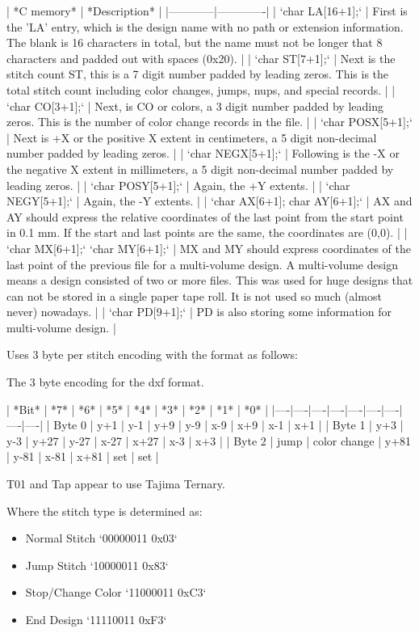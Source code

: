 \documentclass[a4paper, 11pt]{report}
\begin{document}
| *C memory* | *Description* |
|------------|-------------|
| `char LA[16+1];` | First is the 'LA' entry, which is the design name with no path or extension information. The blank is 16 characters in total, but the name must not be longer that 8 characters and padded out with spaces (0x20). |
| `char ST[7+1];` | Next is the stitch count ST, this is a 7 digit number padded by leading zeros. This is the total stitch count including color changes, jumps, nups, and special records. |
| `char CO[3+1];` | Next, is CO or colors, a 3 digit number padded by leading zeros. This is the number of color change records in the file. |
| `char POSX[5+1];` | Next is +X or the positive X extent in centimeters, a 5 digit non-decimal number padded by leading zeros. |
| `char NEGX[5+1];` | Following is the -X or the negative X extent in millimeters, a 5 digit non-decimal number padded by leading zeros. |
| `char POSY[5+1];` | Again, the +Y extents. |
| `char NEGY[5+1];` | Again, the -Y extents. |
| `char AX[6+1]; char AY[6+1];` | AX and AY should express the relative coordinates of the last point from the start point in 0.1 mm. If the start and last points are the same, the coordinates are (0,0). |
| `char MX[6+1];` `char MY[6+1];` | MX and MY should express coordinates of the last point of the previous file for a multi-volume design. A multi-volume design means a design consisted of two or more files. This was used for huge designs that can not be stored in a single paper tape roll. It is not used so much (almost never) nowadays. |
| `char PD[9+1];` | PD is also storing some information for multi-volume design. |

Uses 3 byte per stitch encoding with the format as follows:

The 3 byte encoding for the dxf format.

| *Bit* | *7* | *6* | *5* | *4* | *3* | *2* | *1* | *0* |
|----|----|----|----|----|----|----|----|----|
| Byte 0 | y+1 | y-1 | y+9 | y-9 | x-9 | x+9 | x-1 | x+1 |
| Byte 1 | y+3 | y-3 | y+27 | y-27 | x-27 | x+27 | x-3 | x+3 |
| Byte 2 | jump | color change | y+81 | y-81 | x-81 | x+81 | set | set |

T01 and Tap appear to use Tajima Ternary.
 
Where the stitch type is determined as:

\begin{itemize}
\item Normal Stitch `00000011 0x03`
\item Jump Stitch `10000011 0x83`
\item Stop/Change Color `11000011 0xC3`
\item End Design `11110011 0xF3`
\end{itemize}
\end{document}
